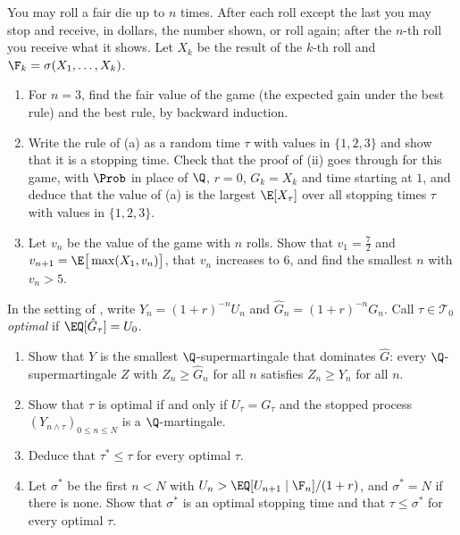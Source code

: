 \begin{exercise}\label{ex:bin-dice}
\easy You may roll a fair die up to $n$ times. After each roll except the last you may
stop and receive, in dollars, the number shown, or roll again; after the $n$-th roll you
receive what it shows. Let $X_k$ be the result of the $k$-th roll and
$\F_k=\sigma(X_1,\dots,X_k)$.
\begin{enumerate}[label=(\alph*)]
  \item For $n=3$, find the fair value of the game (the expected gain under the best
    rule) and the best rule, by backward induction.
  \item Write the rule of (a) as a random time $\tau$ with values in $\{1,2,3\}$ and show
    that it is a stopping time. Check that the proof of (ii)
    goes through for this game, with $\Prob$ in place of $\Q$, $r=0$, $G_k=X_k$ and time
    starting at $1$, and deduce that the value of (a) is the largest $\E[X_\tau]$ over
    all stopping times $\tau$ with values in $\{1,2,3\}$.
  \item Let $v_n$ be the value of the game with $n$ rolls. Show that $v_1=\frac72$ and
    $v_{n+1}=\E\big[\max(X_1,v_n)\big]$, that $v_n$ increases to $6$, and find the
    smallest $n$ with $v_n>5$.
\end{enumerate}
\end{exercise}

\begin{exercise}\label{ex:bin-snell}
\hard In the setting of , write $Y_n=(1+r)^{-n}U_n$ and
$\hat G_n=(1+r)^{-n}G_n$. Call $\tau\in\mathcal T_0$ \emph{optimal} if
$\EQ[\hat G_\tau]=U_0$.
\begin{enumerate}[label=(\alph*)]
  \item Show that $Y$ is the smallest $\Q$-supermartingale that dominates $\hat G$: every
    $\Q$-supermartingale $Z$ with $Z_n\ge\hat G_n$ for all $n$ satisfies $Z_n\ge Y_n$ for
    all $n$.
  \item Show that $\tau$ is optimal if and only if $U_\tau=G_\tau$ and the stopped
    process $(Y_{n\wedge\tau})_{0\le n\le N}$ is a $\Q$-martingale.
  \item Deduce that $\tau^*\le\tau$ for every optimal $\tau$.
  \item Let $\sigma^*$ be the first $n<N$ with $U_n>\EQ[U_{n+1}\mid\F_n]/(1+r)$, and
    $\sigma^*=N$ if there is none. Show that $\sigma^*$ is an optimal stopping time and
    that $\tau\le\sigma^*$ for every optimal $\tau$.
\end{enumerate}
\end{exercise}

